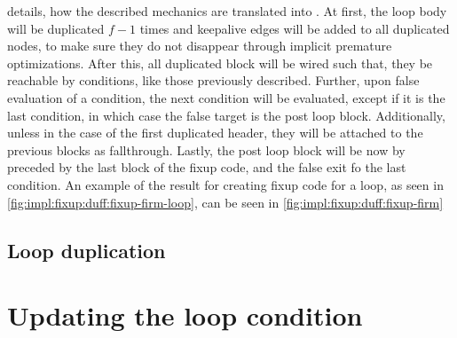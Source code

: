  details, how the described mechanics are translated into \libFIRM.
At first, the loop body will be duplicated $f - 1$ times and keepalive edges will be added to all duplicated nodes, to make sure they do not disappear through implicit premature optimizations.
After this, all duplicated block will be wired such that, they be reachable by conditions, like those previously described.
Further, upon false evaluation of a condition, the next condition will be evaluated, except if it is the last condition, in which case the false target is the post loop block.
Additionally, unless in the case of the first duplicated header, they will be attached to the previous blocks as fallthrough.
Lastly, the post loop block will be now by preceded by the last block of the fixup code, and the false exit fo the last condition.
An example of the result for creating fixup code for a loop, as seen in \cref{fig:impl:fixup:duff:fixup-firm-loop}, can be seen in \cref{fig:impl:fixup:duff:fixup-firm}







\subsection{Loop duplication}\label{sec:impl:fixup:loop}



\section{Updating the loop condition}\label{sec:impl:fixup:header-cond}

